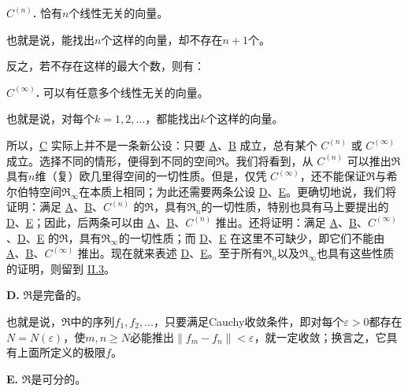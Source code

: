 \documentclass[fontsize=13pt,twoside,openany,headings=normal,parskip=false,bookmarkpackage=false,DIV=calc]{scrbook}
\begin{document}
\leavevmode{}\textbf{$C^{(n)}$.}\label{ax:II.Cn} 恰有$n$个线性无关的向量。

\hypertarget{origpage-24}{}\label{origpage-24}也就是说，能找出$n$个这样的向量，却不存在$n+1$个。

反之，若不存在这样的最大个数，则有：

\leavevmode{}\textbf{$C^{(\infty)}$.}\label{ax:II.Cinfty} 可以有任意多个线性无关的向量。

也就是说，对每个$k=1,\allowbreak 2,\allowbreak \ldots$，都能找出$k$个这样的向量。

所以，\hyperref[ax:II.Cn]{C} 实际上并不是一条新公设：只要 \hyperref[ax:II.A]{A}、\hyperref[ax:II.B]{B} 成立，总有某个 \hyperref[ax:II.Cn]{$C^{(n)}$} 或 \hyperref[ax:II.Cinfty]{$C^{(\infty)}$} 成立。选择不同的情形，便得到不同的空间$\mathfrak{R}$。我们将看到，从 \hyperref[ax:II.Cn]{$C^{(n)}$} 可以推出$\mathfrak{R}$具有$n$维（复）欧几里得空间的一切性质。但是，仅凭 \hyperref[ax:II.Cinfty]{$C^{(\infty)}$}，还不能保证$\mathfrak{R}$与希尔伯特空间$\mathfrak{R}_\infty$在本质上相同；为此还需要两条公设 \hyperref[ax:II.D]{D}、\hyperref[ax:II.E]{E}。更确切地说，我们将证明：满足 \hyperref[ax:II.A]{A}、\hyperref[ax:II.B]{B}、\hyperref[ax:II.Cn]{$C^{(n)}$} 的$\mathfrak{R}$，具有$\mathfrak{R}_n$的一切性质，特别也具有马上要提出的 \hyperref[ax:II.D]{D}、\hyperref[ax:II.E]{E}；因此，后两条可以由 \hyperref[ax:II.A]{A}、\hyperref[ax:II.B]{B}、\hyperref[ax:II.Cn]{$C^{(n)}$} 推出。还将证明：满足 \hyperref[ax:II.A]{A}、\hyperref[ax:II.B]{B}、\hyperref[ax:II.Cinfty]{$C^{(\infty)}$}、\hyperref[ax:II.D]{D}、\hyperref[ax:II.E]{E} 的$\mathfrak{R}$，具有$\mathfrak{R}_\infty$的一切性质；而 \hyperref[ax:II.D]{D}、\hyperref[ax:II.E]{E} 在这里不可缺少，即它们不能由 \hyperref[ax:II.A]{A}、\hyperref[ax:II.B]{B}、\hyperref[ax:II.Cinfty]{$C^{(\infty)}$} 推出。现在就来表述 \hyperref[ax:II.D]{D}、\hyperref[ax:II.E]{E}。至于所有$\mathfrak{R}_n$以及$\mathfrak{R}_\infty$也具有这些性质的证明，则留到 \hyperref[sec:II.3]{II.3}。

\leavevmode{}\textbf{D.}\label{ax:II.D} $\mathfrak{R}$是完备的。

也就是说，$\mathfrak{R}$中的序列$f_1,\allowbreak f_2,\allowbreak \ldots$，只要满足Cauchy收敛条件，即对每个$\varepsilon>0$都存在$N=N(\varepsilon)$，使$m,\allowbreak n\geq N$必能推出$\|f_m-f_n\|<\varepsilon$，就一定收敛；换言之，它具有上面所定义的极限$f$。

\leavevmode{}\textbf{E.}\label{ax:II.E} $\mathfrak{R}$是可分的。
\end{document}
